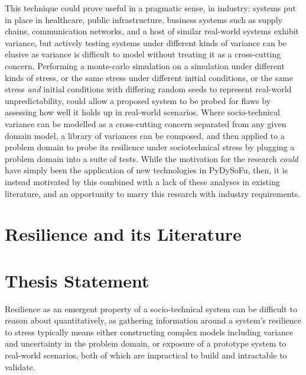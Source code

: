 \documentclass[draft]{article}
\begin{document}
This technique could prove useful in a pragmatic sense, in industry: systems put
in place in healthcare, public infrastructure, business systems such as supply
chains, communication networks, and a host of similar real-world systems exhibit
variance, but actively testing systems under different kinds of variance can be
elusive as variance is difficult to model without treating it as a cross-cutting
concern\cite{caise_forum_18}. Performing a monte-carlo simulation on a
simulation under different kinds of stress, or the same stress under different
initial conditions, or the same stress \emph{and} initial conditions with
differing random seeds to represent real-world unpredictability, could allow a
proposed system to be probed for flaws by assessing how well it holds up in
real-world scenarios. Where socio-technical variance can be modelled as a
cross-cutting concern separated from any given domain model, a library of
variances can be composed, and then applied to a problem domain to probe its
resilience under sociotechnical stress by plugging a problem domain into a suite
of tests. While the motivation for the research \emph{could} have simply been
the application of new technologies in PyDySoFu, then, it is instead motivated
by this combined with a lack of these analyses in existing literature, and an
opportunity to marry this research with industry requirements.\par



\section{Resilience and its Literature}
\label{sec:resilience}



\section{Thesis Statement}
\label{sec:thsis_statement}
Resilience as an emergent property of a socio-technical system can be difficult
to reason about quantitatively, as gathering information around a system's
resilience to stress typically means either constructing complex models
including variance and uncertainty in the problem domain, or exposure of a
prototype system to real-world scenarios, both of which are impractical to build
and intractable to validate.\par
\end{document}
